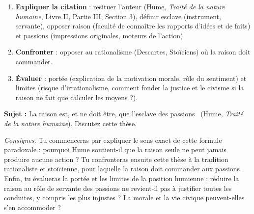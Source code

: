 \documentclass[11pt]{article}
\begin{document}
\begin{methode}
\begin{enumerate}
\item \textbf{Expliquer la citation} : resituer l'auteur (Hume, \emph{Traité de la nature humaine}, Livre II, Partie III, Section 3), définir \guillemotleft esclave \guillemotright (instrument, servante), opposer \guillemotleft raison \guillemotright (faculté de connaître les rapports d'idées et de faits) et \guillemotleft passions \guillemotright (impressions originales, moteurs de l'action).
\item \textbf{Confronter} : opposer au rationalisme (Descartes, Stoïciens) où la raison doit commander.
\item \textbf{Évaluer} : portée (explication de la motivation morale, rôle du sentiment) et limites (risque d'irrationalisme, comment fonder la justice et le civisme si la raison ne fait que calculer les moyens ?).
\end{enumerate}
\end{methode}

\begin{exercice}
\textbf{Sujet :} \guillemotleft La raison est, et ne doit être, que l'esclave des passions \guillemotright\ (Hume, \emph{Traité de la nature humaine}). Discutez cette thèse.

\textit{Consignes.} Tu commenceras par expliquer le sens exact de cette formule paradoxale : pourquoi Hume soutient-il que la raison seule ne peut jamais produire aucune action ? Tu confronteras ensuite cette thèse à la tradition rationaliste et stoïcienne, pour laquelle la raison doit commander aux passions. Enfin, tu évalueras la portée et les limites de la position humienne : réduire la raison au rôle de servante des passions ne revient-il pas à justifier toutes les conduites, y compris les plus injustes ? La morale et la vie civique peuvent-elles s'en accommoder ?
\end{exercice}
\end{document}
